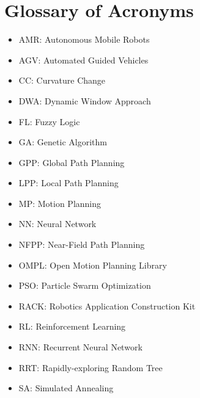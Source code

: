 \chapter*{Glossary of Acronyms}


\begin{itemize}
        \item AMR: Autonomous Mobile Robots
        \item AGV: Automated Guided Vehicles
        \item CC: Curvature Change
        \item DWA: Dynamic Window Approach
        \item FL: Fuzzy Logic
        \item GA: Genetic Algorithm
        \item GPP: Global Path Planning
        \item LPP: Local Path Planning
        \item MP: Motion Planning
        \item NN: Neural Network
        \item NFPP: Near-Field Path Planning
        \item OMPL: Open Motion Planning Library
        \item PSO: Particle Swarm Optimization
        \item RACK: Robotics Application Construction Kit
        \item RL: Reinforcement Learning
        \item RNN: Recurrent Neural Network
        \item RRT: Rapidly-exploring Random Tree
        \item SA: Simulated Annealing
\end{itemize}

\newpage







